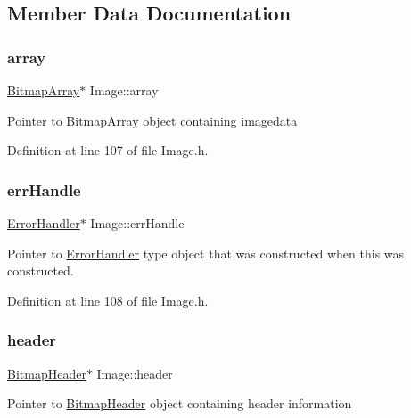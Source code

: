 \subsection{Member Data Documentation}
\mbox{\label{classImage_a1c18dd7d9eda416d44e7eb408d5b3c38}} 
\subsubsection{\texorpdfstring{array}{array}}
{\footnotesize\ttfamily \mbox{\hyperlink{classBitmapArray}{Bitmap\+Array}}$\ast$ Image\+::array\hspace{0.3cm}{\ttfamily [private]}}

Pointer to \mbox{\hyperlink{classBitmapArray}{Bitmap\+Array}} object containing imagedata 

Definition at line 107 of file Image.\+h.

\mbox{\label{classImage_a560753c20e67a544be57bba971021375}} 
\subsubsection{\texorpdfstring{errHandle}{errHandle}}
{\footnotesize\ttfamily \mbox{\hyperlink{classErrorHandler}{Error\+Handler}}$\ast$ Image\+::err\+Handle\hspace{0.3cm}{\ttfamily [private]}}

Pointer to \mbox{\hyperlink{classErrorHandler}{Error\+Handler}} type object that was constructed when this was constructed. 

Definition at line 108 of file Image.\+h.

\mbox{\label{classImage_adaf72c2df8979eafb4031dc0384dc49f}} 
\subsubsection{\texorpdfstring{header}{header}}
{\footnotesize\ttfamily \mbox{\hyperlink{classBitmapHeader}{Bitmap\+Header}}$\ast$ Image\+::header\hspace{0.3cm}{\ttfamily [private]}}

Pointer to \mbox{\hyperlink{classBitmapHeader}{Bitmap\+Header}} object containing header information 

